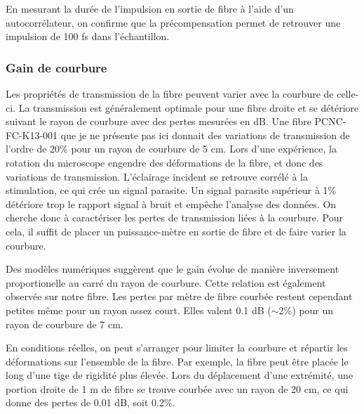 En mesurant la durée de l'impulsion en sortie de fibre à l'aide d'un autocorrélateur, on confirme que la précompensation permet de retrouver une impulsion de 100 fs dans l'échantillon.

\subsubsection{Gain de courbure}


Les propriétés de transmission de la fibre peuvent varier avec la courbure de celle-ci. La transmission est généralement optimale pour une fibre droite et se détériore suivant le rayon de courbure avec des pertes mesurées en dB. Une fibre PCNC-FC-K13-001 que je ne présente pas ici donnait des variations de transmission de l'ordre de 20\% pour un rayon de courbure de 5 cm.
Lors d'une expérience, la rotation du microscope engendre des déformations de la fibre, et donc des variations de transmission. L'éclairage incident se retrouve corrélé à la stimulation, ce qui crée un signal parasite. Un signal parasite supérieur à 1\% détériore trop le rapport signal à bruit et empêche l'analyse des données. On cherche donc à caractériser les pertes de transmission liées à la courbure. Pour cela, il suffit de placer un puissance-mètre en sortie de fibre et de faire varier la courbure.

Des modèles numériques \cite{setti_flexible_2013} \cite{yu_negative_2016} \cite{frosz_analytical_2017} suggèrent que le gain évolue de manière inversement proportionelle au carré du rayon de courbure. Cette relation est également observée sur notre fibre.
Les pertes par mètre de fibre courbée restent cependant petites même pour un rayon assez court. Elles valent 0.1 dB ($\sim$2\%) pour un rayon de courbure de 7 cm.

En conditions réelles, on peut s'arranger pour limiter la courbure et répartir les déformations sur l'ensemble de la fibre. Par exemple, la fibre peut être placée le long d'une tige de rigidité plus élevée. Lors du déplacement d'une extrémité, une portion droite de 1 m de fibre se trouve courbée avec un rayon de 20 cm, ce qui donne des pertes de 0.01 dB, soit 0.2\%.

